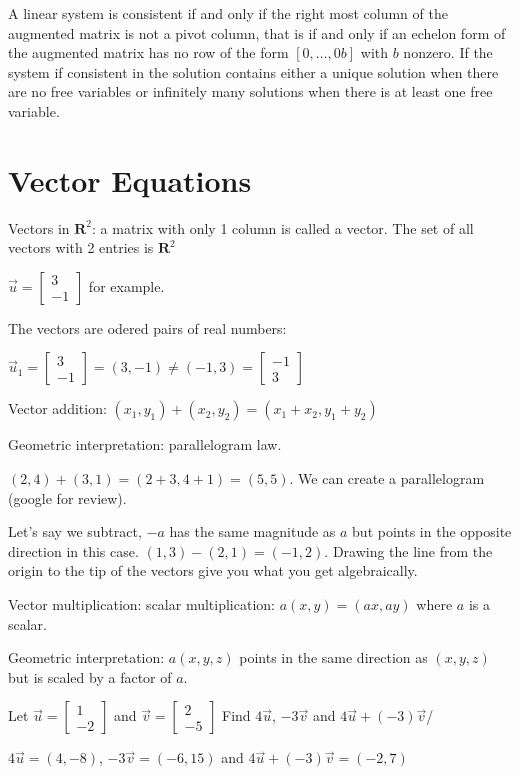 \documentclass[../linalg.tex]{subfiles}
\begin{document}
\begin{theorem}
    A linear system is consistent if and only if the right most column of the augmented matrix is not a pivot column, that is if and only if an echelon form of the augmented matrix 
    has no row of the form $[0,\dots, 0 b]$ with $b$ nonzero. If the system if consistent in the solution contains either a unique solution when there are no free variables or infinitely many solutions when there is at least one free variable.
\end{theorem}

\section{Vector Equations}
Vectors in $\textbf{R}^2$: a matrix with only 1 column is called a vector. The set of all vectors with 2 entries is $\textbf{R}^2$

$\vec{u}=\begin{bmatrix}3\\ -1\end{bmatrix}$ for example.

The vectors are odered pairs of real numbers:

$\vec{u}_1=\begin{bmatrix}
    3\\-1
\end{bmatrix}=(3,-1)\neq (-1,3)=\begin{bmatrix}
    -1\\3
\end{bmatrix}$

Vector addition: $(x_1,y_1)+(x_2,y_2)=(x_1+x_2,y_1+y_2)$

Geometric interpretation: parallelogram law.

$(2,4)+(3,1)=(2+3,4+1)=(5,5)$. We can create a parallelogram (google for review).

Let's say we subtract, $-a$ has the same magnitude as $a$ but points in the opposite direction in this case. $(1,3)-(2,1)=(-1,2)$. Drawing the line from the origin to the tip of the vectors give you what you get algebraically.

Vector multiplication: scalar multiplication: $a(x,y)=(ax,ay)$ where $a$ is a scalar.

Geometric interpretation: $a(x,y,z)$ points in the same direction as $(x,y,z)$ but is scaled by a factor of $a$.

\begin{example}
    Let $\vec{u}=\begin{bmatrix}
        1\\ -2
    \end{bmatrix}$ and $\vec{v} = \begin{bmatrix}
        2\\-5
    \end{bmatrix}$ Find $4\vec{u}$, $-3\vec{v}$ and $4\vec{u}+(-3)\vec{v}$/

    $4\vec{u}=(4,-8)$, $-3\vec{v}=(-6,15)$ and $4\vec{u}+(-3)\vec{v}=(-2,7)$
\end{example}
\end{document}
